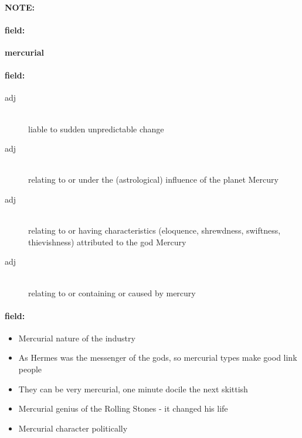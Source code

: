 \documentclass[12pt]{article}
\newenvironment{note}{\paragraph{NOTE:}}{}
\newenvironment{field}{\paragraph{field:}}{}
\begin{document}
\begin{note}
\begin{field}
\textbf{\large mercurial}
\end{field}


\begin{field}
\begin{description}
\item[adj] \hfill \\ 
liable to sudden unpredictable change

\item[adj] \hfill \\ 
relating to or under the (astrological) influence of the planet Mercury

\item[adj] \hfill \\ 
relating to or having characteristics (eloquence, shrewdness, swiftness, thievishness) attributed to the god Mercury

\item[adj] \hfill \\ 
relating to or containing or caused by mercury

\end{description}
\end{field}

\begin{field}
\begin{itemize}
\item Mercurial nature of the industry
\item As Hermes was the messenger of the gods, so mercurial types make good link people
\item They can be very mercurial, one minute docile the next skittish
\item Mercurial genius of the Rolling Stones - it changed his life
\item Mercurial character politically
\end{itemize}
\end{field}
\end{note}
\end{document}
